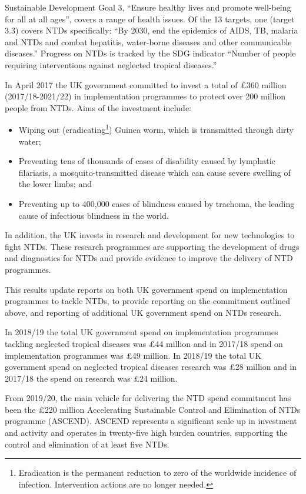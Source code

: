 Sustainable Development Goal 3, ``Ensure healthy lives and promote well-being for all at all ages'', covers a range of health issues. %
Of the 13 targets, one (target 3.3) covers NTDs specifically: ``By 2030, end the epidemics of AIDS, TB, malaria and NTDs and combat hepatitis, water-borne diseases and other communicable diseases.'' %
Progress on NTDs is tracked by the SDG indicator ``Number of people requiring interventions against neglected tropical diseases.'' %

In April 2017 the UK government committed to invest a total of \pounds 360 million (2017/18-2021/22) in implementation programmes to protect over 200 million people from NTDs. %
Aims of the investment include:
\begin{itemize}
\item Wiping out (eradicating\footnote{Eradication is the permanent reduction to zero of the worldwide incidence of infection. Intervention actions are no longer needed.}) Guinea worm, which is transmitted through dirty water;
\item Preventing tens of thousands of cases of disability caused by lymphatic filariasis, a mosquito-transmitted disease which can cause severe swelling of the lower limbs; and
\item Preventing up to 400,000 cases of blindness caused by trachoma, the leading cause of infectious blindness in the world.
\end{itemize}

In addition, the UK invests in research and development for new technologies to fight NTDs. %
These research programmes are supporting the development of drugs and diagnostics for NTDs and provide evidence to improve the delivery of NTD programmes. %

This results update reports on both UK government spend on implementation programmes to tackle NTDs, to provide reporting on the commitment outlined above, and reporting of additional UK government spend on NTDs research. %

In 2018/19 the total UK government spend on implementation programmes tackling neglected tropical diseases was \pounds 44 million and in 2017/18 spend on implementation programmes was \pounds 49 million. %
In 2018/19 the total UK government spend on neglected tropical diseases research was \pounds 28 million and in 2017/18 the spend on research was \pounds 24 million. %

From 2019/20, the main vehicle for delivering the NTD spend commitment has been the \pounds 220 million Accelerating Sustainable Control and Elimination of NTDs programme (ASCEND). %
ASCEND represents a significant scale up in investment and activity and operates in twenty-five high burden countries, supporting the control and elimination of at least five NTDs. %

\newpage

